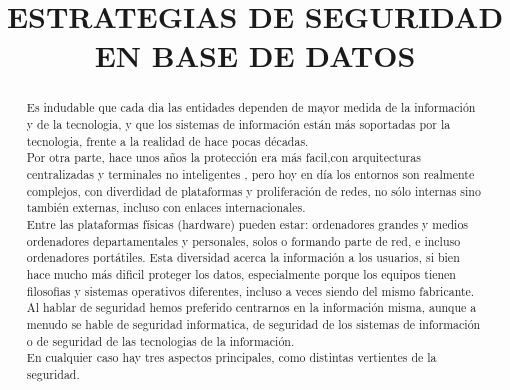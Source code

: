 \documentclass[conference]{IEEEtran}
\begin{document}
\title{ESTRATEGIAS DE SEGURIDAD EN BASE DE DATOS}
\maketitle


\begin{abstract}
Es indudable que cada dia las entidades dependen de mayor medida de la información y de la tecnologia, y que los sistemas de información están más soportadas por la tecnologia, frente a la realidad de hace pocas décadas.
\\
Por otra parte, hace unos años la protección era más facil,con arquitecturas centralizadas y terminales no inteligentes , pero hoy en día los entornos son realmente complejos, con diverdidad de plataformas y proliferación de redes, no sólo internas sino también externas, incluso con enlaces internacionales.
\\
Entre las plataformas físicas (hardware) pueden estar: ordenadores grandes y medios ordenadores departamentales y personales, solos o formando parte de red, e incluso ordenadores portátiles. Esta diversidad acerca la información a los usuarios, si bien hace mucho más dificil proteger los datos, especialmente porque los equipos tienen filosofias y sistemas operativos diferentes, incluso a veces siendo del mismo fabricante.
\\
Al hablar de seguridad hemos preferido centrarnos en la información misma, aunque a menudo se hable de seguridad informatica, de seguridad de los sistemas de información o de seguridad de las tecnologias de la información.
\\
En cualquier caso hay tres aspectos principales, como distintas vertientes de la seguridad.
\\
\end{abstract}
\end{document}
